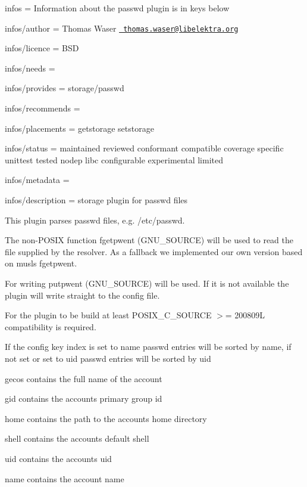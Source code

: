 
\begin{DoxyItemize}
\item infos = Information about the passwd plugin is in keys below
\item infos/author = Thomas Waser \href{mailto:thomas.waser@libelektra.org}{\texttt{ thomas.\+waser@libelektra.\+org}}
\item infos/licence = B\+SD
\item infos/needs =
\item infos/provides = storage/passwd
\item infos/recommends =
\item infos/placements = getstorage setstorage
\item infos/status = maintained reviewed conformant compatible coverage specific unittest tested nodep libc configurable experimental limited
\item infos/metadata =
\item infos/description = storage plugin for passwd files
\end{DoxyItemize}

This plugin parses {\ttfamily passwd} files, e.\+g. {\ttfamily /etc/passwd}.

The non-\/\+P\+O\+S\+IX function {\ttfamily fgetpwent} (G\+N\+U\+\_\+\+S\+O\+U\+R\+CE) will be used to read the file supplied by the resolver. As a fallback we implemented our own version based on musls {\ttfamily fgetpwent}.

For writing {\ttfamily putpwent} (G\+N\+U\+\_\+\+S\+O\+U\+R\+CE) will be used. If it is not available the plugin will write straight to the config file.

For the plugin to be build at least {\ttfamily P\+O\+S\+I\+X\+\_\+\+C\+\_\+\+S\+O\+U\+R\+CE $>$= 200809L} compatibility is required.

If the config key {\ttfamily index} is set to {\ttfamily name} passwd entries will be sorted by name, if not set or set to {\ttfamily uid} passwd entries will be sorted by uid


\begin{DoxyItemize}
\item {\ttfamily gecos} contains the full name of the account
\item {\ttfamily gid} contains the accounts primary group id
\item {\ttfamily home} contains the path to the accounts home directory
\item {\ttfamily shell} contains the accounts default shell
\item {\ttfamily uid} contains the accounts uid
\item {\ttfamily name} contains the account name
\end{DoxyItemize}


\begin{DoxyCode}{0}
\end{DoxyCode}
 